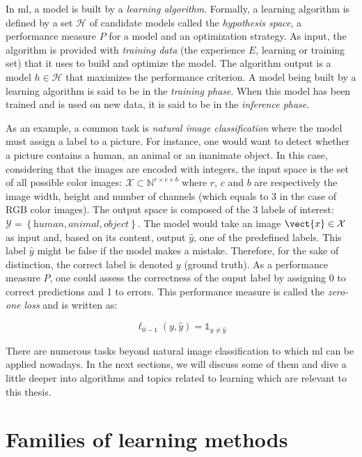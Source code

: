 In \acrlong{ml}, a model is built by a \textit{learning algorithm}. Formally, a
learning algorithm is defined by a set $\mathcal{H}$ of candidate models called
the \textit{hypothesis space}, a performance measure $P$ for a model and an
optimization strategy. As input, the algorithm is provided with \textit{training data}
(the experience $E$, \aka learning or training set) that it uses to build and
optimize the model. The algorithm output is a model $h \in \mathcal{H}$ that
maximizes the performance criterion. A model being built by a learning algorithm
is said to be in the \textit{training phase}. When this model has been trained
and is used on new data, it is said to be in the \textit{inference phase}.

As an example, a common task is \textit{natural image classification} where the
model must assign a label to a picture. For instance, one would want to detect
whether a picture contains a human, an animal or an inanimate object. In this
case, considering that the images are encoded with integers, the input space is
the set of all possible color images: $\mathcal{X} \subset \mathbb{N}^{r\times c\times b}$
where $r$, $c$ and $b$ are respectively the image width, height and number of
channels (which equals to 3 in the case of RGB color images). The output space is
composed of the 3 labels of interest: $\mathcal{Y} = \left\{\textit{human}, \textit{animal}, \textit{object}\right\}$.
The model would take an image $\vect{x} \in \mathcal{X}$ as input and, based on
its content, output $\hat{y}$, one of the predefined labels. This label $\hat{y}$
might be false if the model makes a mistake. Therefore, for the sake of distinction,
the correct label is denoted $y$ (\aka ground truth). As a performance measure
$P$, one could assess the correctness of the ouput label by assigning 0 to correct
predictions and 1 to errors. This performance measure is called the \textit{zero-one loss}
and is written as:

\begin{equation}
\ell_{0-1}(y, \hat{y}) = \mathbb{1}_{y\neq\hat{y}}
\end{equation}

There are numerous tasks beyond natural image classification to which \acrlong{ml}
can be applied nowadays. In the next sections, we will discuss some of them and
dive a little deeper into algorithms and topics related to learning which are
relevant to this thesis.

\section{Families of learning methods}
\label{sec:backml:families}

